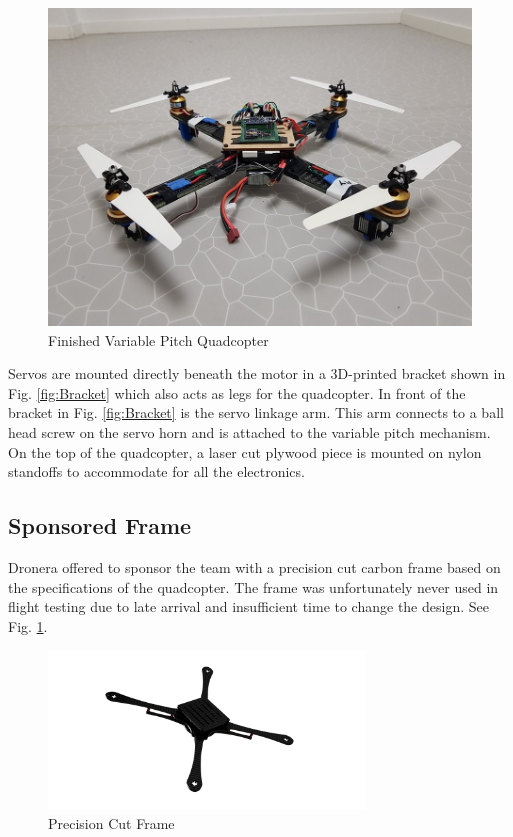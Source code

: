 \begin{figure}[H]
\begin{minipage}[b]{0.5\textwidth}
            \includegraphics[width = \textwidth, angle =0]{VAPIQ-PICTURES/vpqquad}
              \caption{Finished Variable Pitch Quadcopter}
        \end{minipage}
        \end{figure}


Servos are mounted directly beneath the motor in a 3D-printed bracket shown in Fig. \ref{fig:Bracket} which also acts as legs for the quadcopter. In front of the bracket in Fig. \ref{fig:Bracket} is the servo linkage arm. This arm connects to a ball head screw on the servo horn and is attached to the variable pitch mechanism. On the top of the quadcopter, a laser cut plywood piece is mounted on nylon standoffs to accommodate for all the electronics.

\subsection{Sponsored Frame}


Dronera offered to sponsor the team with a precision cut carbon frame based on the specifications of the quadcopter. The frame was unfortunately never used in flight testing due to late arrival and insufficient time to change the design. See Fig. \ref{fig:droneraframe}.

\begin{figure}[H]
\begin{center}
    \includegraphics[width = 0.75\textwidth]{VAPIQ-PICTURES/droneraframe.png}
  \caption{Precision Cut Frame}
  \label{fig:droneraframe}
\end{center}
\end{figure}


